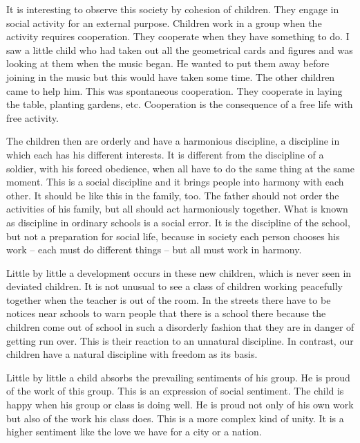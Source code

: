 \documentclass[lang=cn,10pt]{elegantbook}
\begin{document}
It is interesting to observe this society by cohesion of children. They engage in social activity for an external purpose. Children work in a group when the activity requires cooperation. They cooperate when they have something to do. I saw a little child who had taken out all the geometrical cards and figures and was looking at them when the music began. He wanted to put them away before joining in the music but this would have taken some time. The other children came to help him. This was spontaneous cooperation. They cooperate in laying the table, planting gardens, etc. Cooperation is the consequence of a free life with free activity.

The children then are orderly and have a harmonious discipline, a discipline in which each has his different interests. It is different from the discipline of a soldier, with his forced obedience, when all have to do the same thing at the same moment. This is a social discipline and it brings people into harmony with each other. It should be like this in the family, too. The father should not order the activities of his family, but all should act harmoniously together. What is known as discipline in ordinary schools is a social error. It is the discipline of the school, but not a preparation for social life, because in society each person chooses his work – each must do different things – but all must work in harmony.

Little by little a development occurs in these new children, which is never seen in deviated children. It is not unusual to see a class of children working peacefully together when the teacher is out of the room. In the streets there have to be notices near schools to warn people that there is a school there because the children come out of school in such a disorderly fashion that they are in danger of getting run over. This is their reaction to an unnatural discipline. In contrast, our children have a natural discipline with freedom as its basis.

Little by little a child absorbs the prevailing sentiments of his group. He is proud of the work of this group. This is an expression of social sentiment. The child is happy when his group or class is doing well. He is proud not only of his own work but also of the work his class does. This is a more complex kind of unity. It is a higher sentiment like the love we have for a city or a nation.
\end{document}
